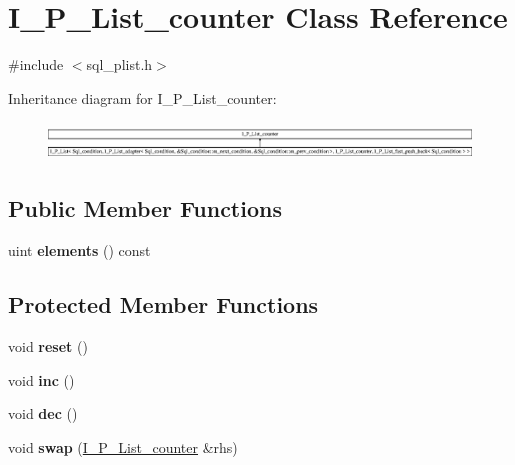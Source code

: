 \hypertarget{classI__P__List__counter}{}\section{I\+\_\+\+P\+\_\+\+List\+\_\+counter Class Reference}
\label{classI__P__List__counter}


{\ttfamily \#include $<$sql\+\_\+plist.\+h$>$}

Inheritance diagram for I\+\_\+\+P\+\_\+\+List\+\_\+counter\+:\begin{figure}[H]
\begin{center}
\leavevmode
\includegraphics[height=1.009009cm]{classI__P__List__counter}
\end{center}
\end{figure}
\subsection*{Public Member Functions}
\begin{DoxyCompactItemize}
\item 
\mbox{\label{classI__P__List__counter_a000118fbd141999b73f9ed984eb05d78}} 
uint {\bfseries elements} () const
\end{DoxyCompactItemize}
\subsection*{Protected Member Functions}
\begin{DoxyCompactItemize}
\item 
\mbox{\label{classI__P__List__counter_a653bf88e4ff5798da11d743ebd466aae}} 
void {\bfseries reset} ()
\item 
\mbox{\label{classI__P__List__counter_a6b893262328fa1589d2255d8ac21afaf}} 
void {\bfseries inc} ()
\item 
\mbox{\label{classI__P__List__counter_ab86e0a25e1ce52ce0afbb792b729b91a}} 
void {\bfseries dec} ()
\item 
\mbox{\label{classI__P__List__counter_aa280ff738f3f9aaed0df2caf0da4f292}} 
void {\bfseries swap} (\mbox{\hyperlink{classI__P__List__counter}{I\+\_\+\+P\+\_\+\+List\+\_\+counter}} \&rhs)
\end{DoxyCompactItemize}


